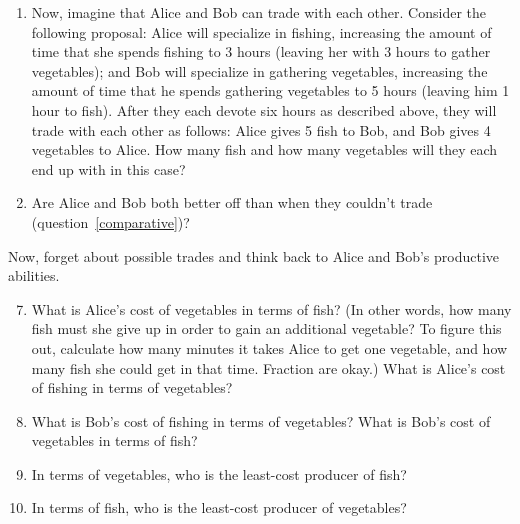 \begin{enumerate}
\begin{enumerate}
    \item Now, imagine that Alice and Bob can trade with each other. Consider the following proposal: Alice will specialize in fishing, increasing the amount of time that she spends fishing to 3 hours (leaving her with 3 hours to gather vegetables); and Bob will specialize in gathering vegetables, increasing the amount of time that he spends gathering vegetables to 5 hours (leaving him 1 hour to fish). After they each devote six hours as described above, they will trade with each other as follows: Alice gives 5 fish to Bob, and Bob gives 4 vegetables to Alice. How many fish and how many vegetables will they each end up with in this case?


    \item Are Alice and Bob both better off than when they couldn't trade (question~\ref{comparative})? %


    \end{enumerate}


Now, forget about possible trades and think back to Alice and Bob's productive abilities.

    \begin{enumerate}
    \setcounter{enumii}{6}
    \item What is Alice's cost of vegetables in terms of fish? (In other words, how many fish must she give up in order to gain an additional vegetable? To figure this out, calculate how many minutes it takes Alice to get one vegetable, and how many fish she could get in that time. Fraction are okay.) What is Alice's cost of fishing in terms of vegetables?


    \item What is Bob's cost of fishing in terms of vegetables? What is Bob's cost of vegetables in terms of fish?


    \item In terms of vegetables, who is the least-cost producer of fish? %



    \item In terms of fish, who is the least-cost producer of vegetables? %




\end{enumerate}
\end{enumerate}
